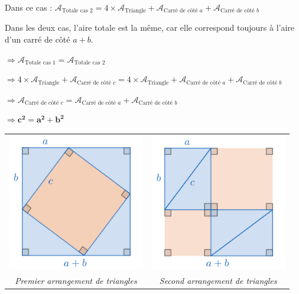 \documentclass[a4paper, twoside]{article}
\begin{document}
Dans ce cas : $\mathcal{A}_{\text{Totale cas 2}} = 4 \times \mathcal{A}_{\text{Triangle}} + \mathcal{A}_{\text{Carré de côté }a} + \mathcal{A}_{\text{Carré de côté }b}$

\medbreak

Dans les deux cas, l'aire totale est la même, 
car elle correspond toujours à l'aire d'un carré
de côté $a+b$.

\smallbreak

$\Longrightarrow \mathcal{A}_{\text{Totale cas 1}} = \mathcal{A}_{\text{Totale cas 2}}$

\smallbreak

$\Longrightarrow 4 \times \mathcal{A}_{\text{Triangle}} + \mathcal{A}_{\text{Carré de côté }c} = 4 \times \mathcal{A}_{\text{Triangle}} + \mathcal{A}_{\text{Carré de côté }a} + \mathcal{A}_{\text{Carré de côté }b}$

\smallbreak

$\Longrightarrow \mathcal{A}_{\text{Carré de côté }c} = \mathcal{A}_{\text{Carré de côté }a} + \mathcal{A}_{\text{Carré de côté }b}$

\smallbreak

$\Longrightarrow \mathbf{c^2 = a^2 + b^2}$


\begin{center}
	\begin{tabular}{cc}
		\includegraphics[width=6cm]{Image/Pythagore/laisnez_cas_1.png} & \includegraphics[width=6cm]{Image/Pythagore/laisnez_cas_2.png} \\
		\textit{Premier arrangement de triangles}                      & \textit{Second arrangement de triangles}                       \\
	\end{tabular}
\end{center}
\end{document}
